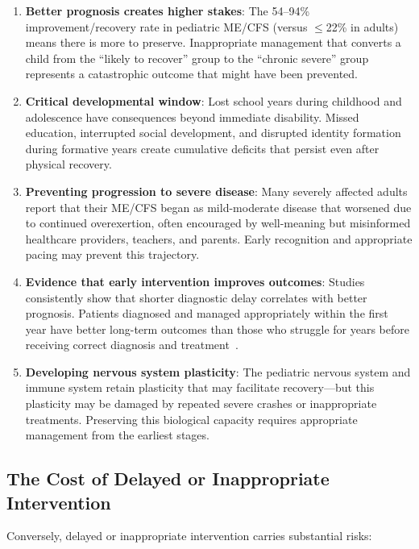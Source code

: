 \begin{enumerate}
    \item \textbf{Better prognosis creates higher stakes}: The 54--94\% improvement/recovery rate in pediatric ME/CFS (versus $\leq$22\% in adults) means there is more to preserve. Inappropriate management that converts a child from the ``likely to recover'' group to the ``chronic severe'' group represents a catastrophic outcome that might have been prevented.

    \item \textbf{Critical developmental window}: Lost school years during childhood and adolescence have consequences beyond immediate disability. Missed education, interrupted social development, and disrupted identity formation during formative years create cumulative deficits that persist even after physical recovery.

    \item \textbf{Preventing progression to severe disease}: Many severely affected adults report that their ME/CFS began as mild-moderate disease that worsened due to continued overexertion, often encouraged by well-meaning but misinformed healthcare providers, teachers, and parents. Early recognition and appropriate pacing may prevent this trajectory.

    \item \textbf{Evidence that early intervention improves outcomes}: Studies consistently show that shorter diagnostic delay correlates with better prognosis. Patients diagnosed and managed appropriately within the first year have better long-term outcomes than those who struggle for years before receiving correct diagnosis and treatment~\cite{Rowe2019pediatric}.

    \item \textbf{Developing nervous system plasticity}: The pediatric nervous system and immune system retain plasticity that may facilitate recovery---but this plasticity may be damaged by repeated severe crashes or inappropriate treatments. Preserving this biological capacity requires appropriate management from the earliest stages.
\end{enumerate}

\subsection{The Cost of Delayed or Inappropriate Intervention}

Conversely, delayed or inappropriate intervention carries substantial risks:

